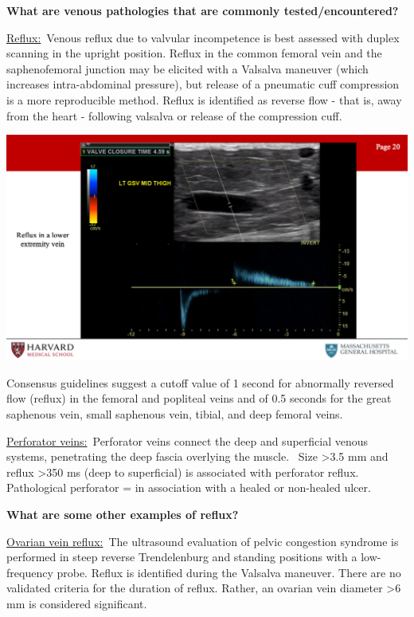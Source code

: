 \documentclass[
]{book}
\begin{document}
\textbf{What are venous pathologies that are commonly tested/encountered?}

\uline{Reflux:}~Venous reflux due to valvular incompetence is best
assessed with duplex scanning in the upright position. Reflux in the
common femoral vein and the saphenofemoral junction may be elicited with
a Valsalva maneuver (which increases intra-abdominal pressure), but
release of a pneumatic cuff compression is a more reproducible method.
Reflux is identified as reverse flow - that is, away from the heart -
following valsalva or release of the compression cuff.

\includegraphics[width=15.01in]{images/vasc_lab2/Slide21}

Consensus guidelines suggest a cutoff value of 1 second for abnormally
reversed flow (reflux) in the femoral and popliteal veins and of 0.5
seconds for the great saphenous vein, small saphenous vein, tibial, and
deep femoral veins.

\uline{Perforator veins:}~Perforator veins connect the deep and
superficial venous systems, penetrating the deep fascia overlying the
muscle.~ Size \textgreater3.5 mm and reflux \textgreater350 ms (deep to superficial) is
associated with perforator reflux. Pathological perforator = in
association with a healed or non-healed ulcer.

\textbf{What are some other examples of reflux?}

\uline{Ovarian vein reflux:}~The ultrasound evaluation of pelvic
congestion syndrome is performed in steep reverse Trendelenburg and
standing positions with a low-frequency probe. Reflux is identified
during the Valsalva maneuver. There are no validated criteria for the
duration of reflux. Rather, an ovarian vein diameter \textgreater6 mm is
considered significant.
\end{document}
